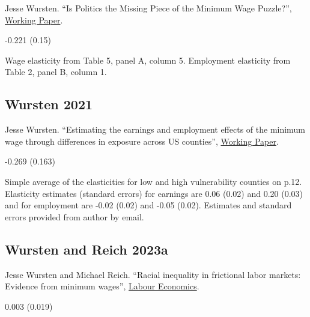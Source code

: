 \noindent Jesse Wursten. ``Is Politics the Missing Piece of the Minimum Wage Puzzle?'', \href{http://dx.doi.org/10.13140/RG.2.2.14177.20329}{Working Paper}.

\vspace{0.7em}

 -0.221 (0.15)

\vspace{0.7em}

 Wage elasticity from Table 5, panel A, column 5. Employment elasticity from Table 2, panel B, column 1.

\subsection*{Wursten 2021}
\vspace{-0.7em}

\noindent Jesse Wursten. ``Estimating the earnings and employment effects of the minimum wage through differences in exposure across US counties'', \href{https://www.dropbox.com/s/2f5j0mjyama8q0p/CAMWE_draft36.pdf?dl=0}{Working Paper}.

\vspace{0.7em}

 -0.269 (0.163)

\vspace{0.7em}

 Simple average of the elasticities for low and high vulnerability counties on p.12. Elasticity estimates (standard errors) for earnings are 0.06 (0.02) and 0.20 (0.03) and for employment are -0.02 (0.02) and -0.05 (0.02). Estimates and standard errors provided from author by email.

\subsection*{Wursten and Reich 2023a}
\vspace{-0.7em}

\noindent Jesse Wursten and Michael Reich. ``Racial inequality in frictional labor markets: Evidence from minimum wages'', \href{https://doi.org/10.1016/j.labeco.2023.102344}{Labour Economics}.

\vspace{0.7em}

 0.003 (0.019)

